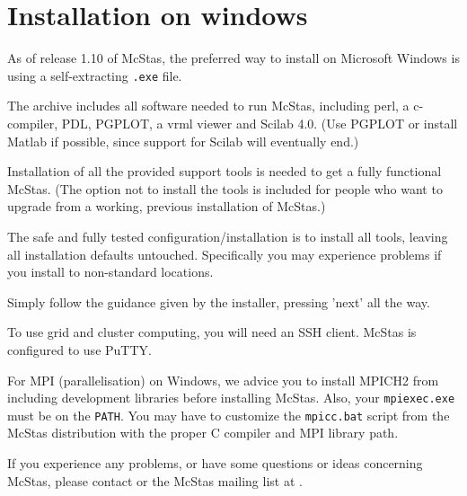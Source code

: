 \section{Installation on windows}
\label{s:win32_install}
As of release 1.10 of McStas, the preferred way to install on
Microsoft Windows is using a self-extracting \texttt{.exe} file.

\noindent The archive includes all software needed to run McStas, including perl, a
c-compiler, PDL, PGPLOT, a vrml viewer and Scilab 4.0. (Use PGPLOT or
install Matlab if possible, since support for Scilab will eventually end.)

\noindent Installation of all the provided support tools is needed to get a fully
functional McStas. (The option not to install the tools is included for people who want to
upgrade from a working, previous installation of McStas.)

\noindent The safe and fully tested configuration/installation is to install all
tools, leaving all installation defaults untouched. Specifically you
may experience problems if you install to non-standard locations.

\noindent Simply follow the guidance given by the installer, pressing 'next' all
the way.

\noindent To use grid and cluster computing, you will need an SSH client. McStas is configured to
use PuTTY.

\noindent For MPI (parallelisation) on Windows, we advice you to install MPICH2 from  including development libraries before installing McStas. Also, your \verb+mpiexec.exe+ must be on the \verb+PATH+. You may have to customize the \verb+mpicc.bat+ script from the McStas distribution with the proper C compiler and MPI library path.

\noindent If you experience any problems, or have some questions or ideas
concerning McStas, please contact
or the McStas mailing list at .


